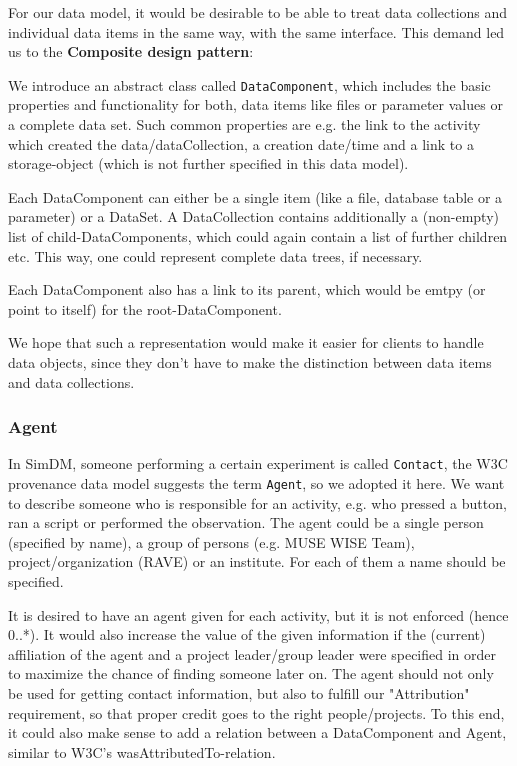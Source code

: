 \documentclass[11pt,a4paper]{ivoa}
\begin{document}
For our data model, it would be desirable to be able to treat data collections and individual data items in
the same way, with the same interface. This demand led us to the 
\textbf{Composite design pattern}:


We introduce an abstract class called \texttt{DataComponent}, which 
includes the basic properties and functionality for both, data items like files or 
parameter values or a complete data set. Such common properties are e.g. the link 
to the activity which created the data/dataCollection, a creation date/time and a link to a
storage-object (which is not further specified in this data model).

Each DataComponent can either be a single item (like a file, database table or a parameter) 
or a DataSet. A DataCollection contains additionally a (non-empty) list of child-DataComponents, 
which could again contain a list of 
further children etc. This way, one could represent complete data trees, if necessary.

Each DataComponent also has a link to its parent, which would be 
emtpy (or point to itself) for the root-DataComponent.

We hope that such a representation would make it easier for clients to handle data 
objects, since they don't have to make the distinction between data items and data 
collections. 


\subsubsection{Agent}
In SimDM, someone performing a certain experiment is called \texttt{Contact}, 
the W3C provenance data model suggests the term \texttt{Agent}, so we adopted it here.
We want to describe someone who is responsible for an activity, e.g. who pressed a button, 
ran a script or performed the observation. The agent could be a single person 
(specified by name), a group of persons (e.g. MUSE WISE Team), project/organization (RAVE) or an institute. 
For each of them a name should be specified.

It is desired to have an agent given for each activity, but it
is not enforced (hence 0..*).  It would also increase the value of the given
information if the (current) affiliation of the agent and a project leader/group
leader were specified in order to maximize the chance of finding someone later
on. The agent should not only be used for getting contact information, but also 
to fulfill our "Attribution" requirement, so that proper credit goes to the right 
people/projects. To this end, it could also make sense to add a relation between a DataComponent and Agent, similar to W3C's wasAttributedTo-relation.
\end{document}
